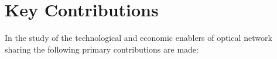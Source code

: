 %
%
%
%
%


\section{Key Contributions}
In the study of the technological and economic enablers of optical network sharing the following primary contributions are made:

